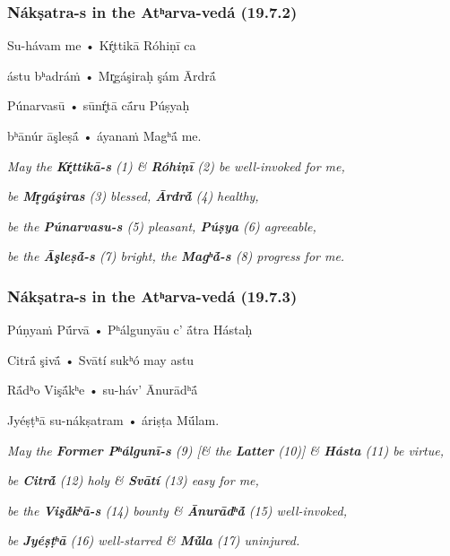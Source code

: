 \documentclass[pdf]{beamer}
\begin{document}
\begin{frame} \frametitle{Nákṣatra-s in the Atʰarva-vedá (19.7.2)}
\begin{center}
	Su-hávam me • Kŕ̥ttikā Róhiṇī ca

	ástu bʰadráṁ • Mr̥gáşiraḥ şám Ārdrā́

	Púnarvasū • sūnŕ̥tā cā́ru Púṣyaḥ

	bʰānúr āşleṣā́ • áyanaṁ Magʰā́ me.

	\vspace{12pt}

	\textit{May the \textbf{Kŕ̥ttikā-s} (1) \& \textbf{Róhiṇī} (2) be well-invoked for me,}

	\textit{be \textbf{Mr̥gáşiras} (3) blessed, \textbf{Ārdrā́} (4) healthy,}

	\textit{be the \textbf{Púnarvasu-s} (5) pleasant, \textbf{Púṣya} (6) agreeable,}

	\textit{be the \textbf{Āşleṣā́-s} (7) bright, the \textbf{Magʰā́-s} (8) progress for me.}
\end{center}
\end{frame}

\begin{frame} \frametitle{Nákṣatra-s in the Atʰarva-vedá (19.7.3)}
\begin{center}
	Púṇyaṁ Pū́rvā • Pʰálgunyāu c’ ā́tra Hástaḥ

	Citrā́ şivā́ • Svātí sukʰó may astu

	Rā́dʰo Vişā́kʰe • su-háv’ Ānurādʰā́

	Jyéṣṭʰā su-nákṣatram • áriṣṭa Mū́lam.

	\vspace{12pt}

	\textit{May the \textbf{Former Pʰálgunī-s} (9) [\& the \textbf{Latter} (10)] \& \textbf{Hásta} (11) be virtue,}

	\textit{be \textbf{Citrā́} (12) holy \& \textbf{Svātí} (13) easy for me,}

	\textit{be the \textbf{Vişā́kʰā-s} (14) bounty \& \textbf{Ānurādʰā́} (15) well-invoked,}

	\textit{be \textbf{Jyéṣṭʰā} (16) well-starred \& \textbf{Mū́la} (17) uninjured.}
\end{center}
\end{frame}
\end{document}

